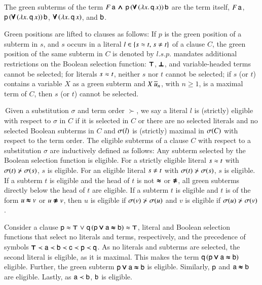 \begin{exa} The green subterms of the term $F \, \mathsf{a} \, \pmb{\land} \, \mathsf{p} \,
(\pmb{\forall} \, (\lambda x. \, \mathsf{q} \, x)) \, \mathsf{b}$ are the term itself, $F \, \mathsf{a}$, $\mathsf{p} \, (\pmb{\forall} \, (\lambda x. \, \mathsf{q} \, x))
\, \mathsf{b}$, $\pmb{\forall} \, (\lambda x. \, \mathsf{q} \, x)$, and $\mathsf{b}$.
\end{exa} 
%
Green positions are lifted to clauses as follows: If $p$ is the green position
of a subterm in $s$, and $s$ occurs in a literal $l \in \{s \eq t{,}\; s \not\eq
t\}$ of a clause $C$, the green position of the same subterm in $C$ is denoted by $l.s.p$.
\osup{} mandates additional restrictions on the Boolean selection function:
$\pmb{\top}$, $\pmb{\bot}$, and variable-headed terms cannot be selected; for literals
$s \approx t$, neither $s$ nor $t$ cannot be selected; if $s$ (or $t$) contains a
variable $X$ as a green subterm and $X\> \overline{u}_{n}$, with $n \ge 1$, is a
maximal term of $C$, then $s$ (or $t$) cannot be selected.

\begin{defi}[Eligibility]
  \,Given a substitution $\sigma$ and term order $\succ$, we say a literal $l$
  is (strictly) eligible with respect to $\sigma$ in $C$ if it is selected in
  $C$ or there are no selected literals and no selected Boolean subterms in
  $C$ and $\sigma(l)$ is (strictly) maximal in $\sigma(C)$ with respect to the
  term order.
%
  The eligible subterms of a clause $C$ with respect to a substitution
  $\sigma$ are inductively defined as follows:
  Any subterm selected by the Boolean selection function is eligible.
  For a strictly eligible literal $s \approx t$ with $\sigma(t) \not\succ
  \sigma(s)$, $s$ is eligible. For an eligible literal $s \not\eq t$ with
  $\sigma(t) \not\succ \sigma(s)$, $s$ is eligible. If a subterm $t$ is eligible
  and the head of $t$ is not $\pmb{\approx}$ or $\pmb{\not\approx}$, all green subterms directly below the head of
  $t$ are eligible. If a subterm $t$ is eligible and $t$ is of the form $u
  \pmb{\approx} v$ or $u \pmb{\not\approx} v$, then $u$ is eligible if $\sigma(v) \not\succ \sigma(u)$
  and $v$ is eligible if $\sigma(u) \not\succ \sigma(v)$.
\end{defi}

\begin{exa}
  Consider a clause $\mathsf{p} \approx \pmb{\top} \mathrel\lor \mathsf{q} \, (\mathsf{p} \pmb{\lor} \mathsf{a}
  \pmb{\approx} \mathsf{b}) \approx \pmb{\top}$, literal and Boolean selection functions that select no
  literals and terms, respectively, and the precedence of symbols $\pmb{\top} \prec
  \mathsf{a} \prec \mathsf{b} \prec \mathsf{c} \prec \mathsf{p} \prec \mathsf{q}$. As no
  literals and subterms are selected, the second literal is eligible, as it is maximal. This makes the term 
  $\mathsf{q} \, (\mathsf{p} \pmb{\lor} \mathsf{a} \pmb{\approx} \mathsf{b})$ eligible. Further, the green subterm
  $\mathsf{p} \pmb{\lor} \mathsf{a} \pmb{\approx} \mathsf{b}$ is eligible. Similarly, $\mathsf{p}$ and $\mathsf{a} \pmb{\approx} \mathsf{b}$
  are eligible. Lastly, as $\mathsf{a} \prec \mathsf{b}$, $\mathsf{b}$ is eligible.
\end{exa}


